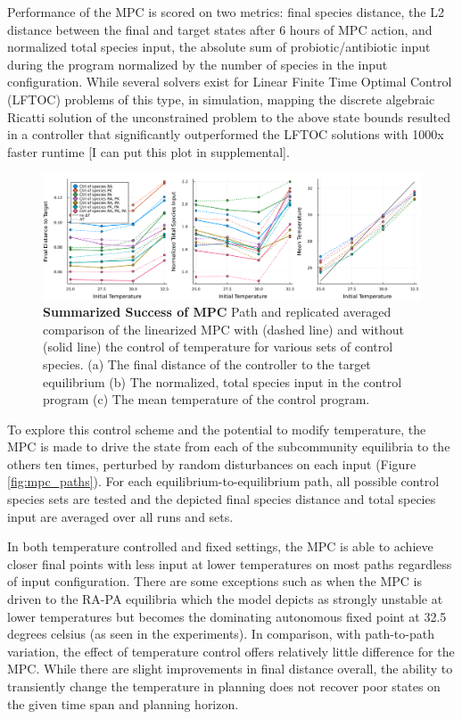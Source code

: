 \documentclass[twocolumn, 10pt]{report}
\begin{document}
{Performance of the MPC is scored on two metrics: final species distance, the L2 distance between the final and target states after 6 hours of MPC action, and normalized total species input, the absolute sum of probiotic/antibiotic input during the program normalized by the number of species in the input configuration. While several solvers exist for Linear Finite Time Optimal Control (LFTOC) problems of this type, in simulation, mapping the discrete algebraic Ricatti solution of the unconstrained problem to the above state bounds resulted in a controller that significantly outperformed the LFTOC solutions with 1000x faster runtime [I can put this plot in supplemental].

\begin{figure}[!htb]
    \centering
    \includegraphics[width=2.0\columnwidth]{figs/MPC_Overall_Figure_allconfig.png}
    \centering
    \caption{\textbf{Summarized Success of MPC} Path and replicated averaged comparison of the linearized MPC with (dashed line) and without (solid line) the control of temperature for various sets of control species. (a) The final distance of the controller to the target equilibrium (b) The normalized, total species input in the control program (c) The mean temperature of the control program. }\label{fig:mpc_overall}
\end{figure}

To explore this control scheme and the potential to modify temperature, the MPC is made to drive the state from each of the subcommunity equilibria to the others ten times, perturbed by random disturbances on each input (Figure \ref{fig:mpc_paths}). For each equilibrium-to-equilibrium path, all possible control species sets are tested and the depicted final species distance and total species input are averaged over all runs and sets. 

In both temperature controlled and fixed settings, the MPC is able to achieve closer final points with less input at lower temperatures on most paths regardless of input configuration. There are some exceptions such as when the MPC is driven to the RA-PA equilibria which the model depicts as strongly unstable at lower temperatures but becomes the dominating autonomous fixed point at 32.5 degrees celsius (as seen in the experiments). In comparison, with path-to-path variation, the effect of temperature control offers relatively little difference for the MPC. While there are slight improvements in final distance overall, the ability to transiently change the temperature in planning does not recover poor states on the given time span and planning horizon.

}
\end{document}
